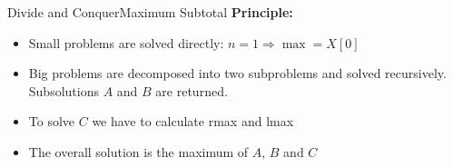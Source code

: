 
\begin{frame}{Divide and Conquer}{Maximum Subtotal}
  \textbf{Principle:}
  \begin{figure}[!h]
    \begin{adjustbox}{width=\linewidth}
      
    \end{adjustbox}
    \label{fig:divide_and_conquer:max_sub_total_divide2}
  \end{figure}
  \vspace{-1.5em}
  \begin{itemize}
    \item<2->
      Small problems are solved directly:
      {\color{MainA}$n = 1 \Rightarrow \max = X[0]$}
    \item<3->
      Big problems are decomposed into two subproblems and solved recursively.
      Subsolutions {\color{MainA}$A$} and {\color{MainA}$B$}
      are returned.
    \item<4->
      To solve {\color{MainA}$C$} we have to calculate
      {\color{MainA}rmax} and {\color{MainA}lmax}
    \item<5->
      The overall solution is the maximum of {\color{MainA}$A$},
      {\color{MainA}$B$} and {\color{MainA}$C$}
  \end{itemize}
\end{frame}


